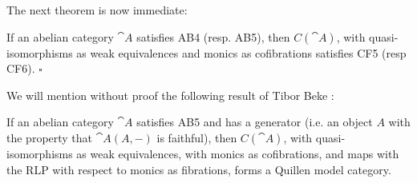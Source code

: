 The next theorem is now immediate:

\begin{thm}
\label{thm:abcatisabccat3}
If an abelian category ${\cat A}$ satisfies AB4 (resp. AB5), then $C({\cat A})$, with quasi-isomorphisms as weak equivalences and monics as cofibrations satisfies CF5 (resp CF6). $\square$
\end{thm}

We will mention without proof the following result of Tibor Beke \cite{Beke1}:
\begin{thm}
\label{thm:abcatisabccat4}
If an abelian category ${\cat A}$ satisfies AB5 and has a generator (i.e. an object $A$ with the property that ${\cat A}(A, -)$ is faithful), then $C({\cat A})$, with quasi-isomorphisms as weak equivalences, with monics as cofibrations, and maps with the RLP with respect to monics as fibrations, forms a Quillen model category.
\end{thm}

